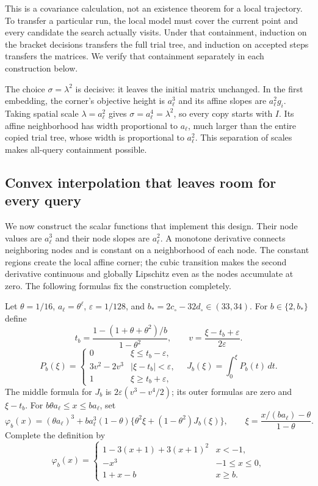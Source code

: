 This is a covariance calculation, not an existence theorem for a local
trajectory. To transfer a particular run, the local model must cover the
current point and every candidate the search actually visits. Under that
containment, induction on the bracket decisions transfers the full trial
tree, and induction on accepted steps transfers the matrices. We verify
that containment separately in each construction below.

The choice $\sigma=\lambda^2$ is decisive: it leaves the initial matrix
unchanged. In the first embedding, the corner's objective height is $a_\ell^3$
and its affine slopes are $a_\ell^2g_i$. Taking spatial scale
$\lambda=a_\ell^2$ gives $\sigma=a_\ell^4=\lambda^2$, so every copy starts
with $I$. Its affine neighborhood has width proportional to $a_\ell$, much
larger than the entire copied trial tree, whose width is proportional to
$a_\ell^2$. This separation of scales makes all-query containment possible.

\subsection{Convex interpolation that leaves room for every query}
We now construct the scalar functions that implement this design. Their node
values are $a_\ell^3$ and their node slopes are $a_\ell^2$. A monotone derivative
connects neighboring nodes and is constant on a neighborhood of each node.
The constant regions create the local affine corner; the cubic transition
makes the second derivative continuous and globally Lipschitz even as the
nodes accumulate at zero. The following formulas fix the construction
completely.

Let $\theta=1/16$, $a_\ell=\theta^\ell$, $\varepsilon=1/128$, and
$b_*=2c_\circ-32d_\circ\in(33,34)$. For $b\in\{2,b_*\}$ define
\[
 t_b=\frac{1-(1+\theta+\theta^2)/b}{1-\theta^2},\qquad
 v=\frac{\xi-t_b+\varepsilon}{2\varepsilon}.
\]
\[
 P_b(\xi)=
 \begin{cases}
 0&\xi\le t_b-\varepsilon,\\
 3v^2-2v^3&|\xi-t_b|<\varepsilon,\\
 1&\xi\ge t_b+\varepsilon,
 \end{cases}
 \quad J_b(\xi)=\int_0^\xi P_b(t)\,dt.
\]
The middle formula for $J_b$ is $2\varepsilon(v^3-v^4/2)$; its outer
formulas are zero and $\xi-t_b$. For
$b\theta a_\ell\le x\le ba_\ell$, set
\begin{equation}\label{art:upper_scalar}
 \varphi_b(x)=(\theta a_\ell)^3+
 ba_\ell^3(1-\theta)
 \{\theta^2\xi+(1-\theta^2)J_b(\xi)\},\qquad
 \xi=\frac{x/(ba_\ell)-\theta}{1-\theta}.
\end{equation}
Complete the definition by
\[
 \varphi_b(x)=
 \begin{cases}
 1-3(x+1)+3(x+1)^2&x<-1,\\
 -x^3&-1\le x\le0,\\
 1+x-b&x\ge b.
 \end{cases}
\]

